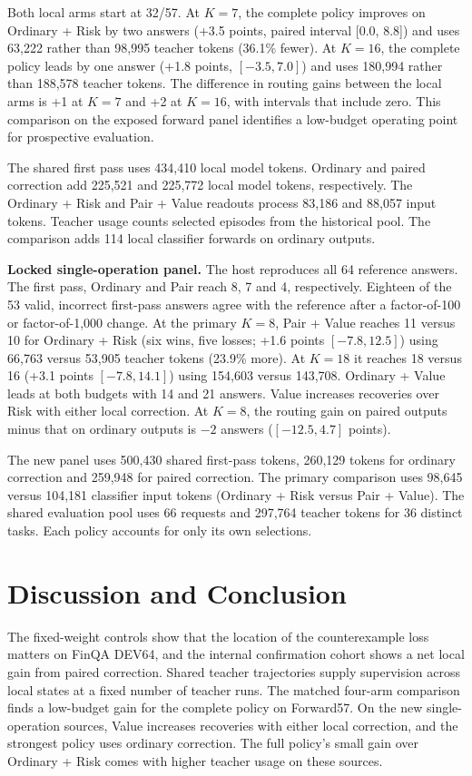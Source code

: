 \documentclass[10pt,letterpaper,conference]{IEEEtran}
\begin{document}
Both local arms start at 32/57. At \(K=7\), the complete policy improves on Ordinary + Risk by two answers (+3.5 points, paired interval {[}0.0, 8.8{]}) and uses 63,222 rather than 98,995 teacher tokens (36.1\% fewer). At \(K=16\), the complete policy leads by one answer (+1.8 points, \([-3.5, 7.0]\)) and uses 180,994 rather than 188,578 teacher tokens. The difference in routing gains between the local arms is +1 at \(K=7\) and +2 at \(K=16\), with intervals that include zero. This comparison on the exposed forward panel identifies a low-budget operating point for prospective evaluation.

The shared first pass uses 434,410 local model tokens. Ordinary and paired correction add 225,521 and 225,772 local model tokens, respectively. The Ordinary + Risk and Pair + Value readouts process 83,186 and 88,057 input tokens. Teacher usage counts selected episodes from the historical pool. The comparison adds 114 local classifier forwards on ordinary outputs.

\textbf{Locked single-operation panel.} The host reproduces all 64 reference answers. The first pass, Ordinary and Pair reach 8, 7 and 4, respectively. Eighteen of the 53 valid, incorrect first-pass answers agree with the reference after a factor-of-100 or factor-of-1,000 change. At the primary \(K=8\), Pair + Value reaches 11 versus 10 for Ordinary + Risk (six wins, five losses; +1.6 points \([-7.8, 12.5]\)) using 66,763 versus 53,905 teacher tokens (23.9\% more). At \(K=18\) it reaches 18 versus 16 (+3.1 points \([-7.8, 14.1]\)) using 154,603 versus 143,708. Ordinary + Value leads at both budgets with 14 and 21 answers. Value increases recoveries over Risk with either local correction. At \(K=8\), the routing gain on paired outputs minus that on ordinary outputs is \(-2\) answers (\([-12.5, 4.7]\) points).

The new panel uses 500,430 shared first-pass tokens, 260,129 tokens for ordinary correction and 259,948 for paired correction. The primary comparison uses 98,645 versus 104,181 classifier input tokens (Ordinary + Risk versus Pair + Value). The shared evaluation pool uses 66 requests and 297,764 teacher tokens for 36 distinct tasks. Each policy accounts for only its own selections.

\section{Discussion and Conclusion}\label{discussion-and-conclusion}

The fixed-weight controls show that the location of the counterexample loss matters on FinQA DEV64, and the internal confirmation cohort shows a net local gain from paired correction. Shared teacher trajectories supply supervision across local states at a fixed number of teacher runs. The matched four-arm comparison finds a low-budget gain for the complete policy on Forward57. On the new single-operation sources, Value increases recoveries with either local correction, and the strongest policy uses ordinary correction. The full policy's small gain over Ordinary + Risk comes with higher teacher usage on these sources.
\end{document}
